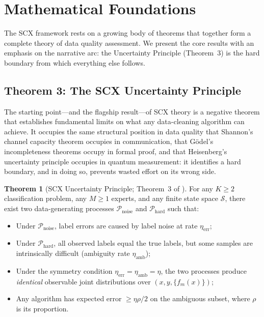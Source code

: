 \documentclass[twocolumn]{article}
\theoremstyle{definition}
\newtheorem{theorem}{Theorem}
\begin{document}
\section{Mathematical Foundations}

The SCX framework rests on a growing body of theorems that together form a complete theory of data quality assessment. We present the core results with an emphasis on the narrative arc: the Uncertainty Principle (Theorem~3) is the hard boundary from which everything else follows.

\subsection{Theorem 3: The SCX Uncertainty Principle}

The starting point---and the flagship result---of SCX theory is a negative theorem that establishes fundamental limits on what any data-cleaning algorithm can achieve. It occupies the same structural position in data quality that Shannon's channel capacity theorem occupies in communication, that G\"{o}del's incompleteness theorems occupy in formal proof, and that Heisenberg's uncertainty principle occupies in quantum measurement: it identifies a hard boundary, and in doing so, prevents wasted effort on its wrong side.

\begin{theorem}[SCX Uncertainty Principle; Theorem~3 of \cite{paperI}]
\label{thm:unidentifiability}
For any $K \geq 2$ classification problem, any $M \geq 1$ experts, and any finite state space $\mathcal{S}$, there exist two data-generating processes $\mathcal{P}_{\text{noise}}$ and $\mathcal{P}_{\text{hard}}$ such that:
\begin{itemize}
  \item Under $\mathcal{P}_{\text{noise}}$, label errors are caused by label noise at rate $\eta_{\text{err}}$;
  \item Under $\mathcal{P}_{\text{hard}}$, all observed labels equal the true labels, but some samples are intrinsically difficult (ambiguity rate $\eta_{\text{amb}}$);
  \item Under the symmetry condition $\eta_{\text{err}} = \eta_{\text{amb}} = \eta$, the two processes produce \emph{identical} observable joint distributions over $(x, y, \{f_m(x)\})$;
  \item Any algorithm has expected error $\geq \eta\rho/2$ on the ambiguous subset, where $\rho$ is its proportion.
\end{itemize}
\end{theorem}
\end{document}
